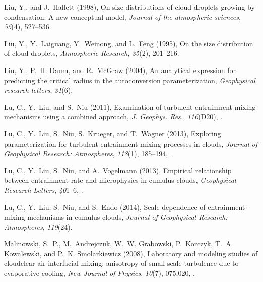 \documentclass[draft,linenumbers]{agujournal}
\begin{document}
\begin{thebibliography}{60}
Liu, Y., and J.~Hallett (1998), On size distributions of cloud droplets growing
  by condensation: A new conceptual model, \textit{Journal of the atmospheric
  sciences}, \textit{55}(4), 527--536.

Liu, Y., Y.~Laiguang, Y.~Weinong, and L.~Feng (1995), On the size distribution
  of cloud droplets, \textit{Atmospheric Research}, \textit{35}(2), 201--216.

Liu, Y., P.~H. Daum, and R.~McGraw (2004), An analytical expression for
  predicting the critical radius in the autoconversion parameterization,
  \textit{Geophysical research letters}, \textit{31}(6).

Lu, C., Y.~Liu, and S.~Niu (2011), Examination of turbulent entrainment-mixing
  mechanisms using a combined approach, \textit{J. Geophys. Res.},
  \textit{116}(D20), .

Lu, C., Y.~Liu, S.~Niu, S.~Krueger, and T.~Wagner (2013{}), Exploring
  parameterization for turbulent entrainment-mixing processes in clouds,
  \textit{Journal of Geophysical Research: Atmospheres}, \textit{118}(1),
  185--194, .

Lu, C., Y.~Liu, S.~Niu, and A.~Vogelmann (2013{}), Empirical relationship between entrainment rate and microphysics in cumulus clouds, \textit{Geophysical Research Letters}, \textit{40}1--6, .
  
Lu, C., Y.~Liu, S.~Niu, and S.~Endo (2014), Scale dependence of
  entrainment-mixing mechanisms in cumulus clouds, \textit{Journal of
  Geophysical Research: Atmospheres}, \textit{119}(24).

Malinowski, S.~P., M.~Andrejczuk, W.~W. Grabowski, P.~Korczyk, T.~A.
  Kowalewski, and P.~K. Smolarkiewicz (2008), Laboratory and modeling studies
  of cloud{\textendash}clear air interfacial mixing: anisotropy of small-scale
  turbulence due to evaporative cooling, \textit{New Journal of Physics},
  \textit{10}(7), 075,020, .


\end{thebibliography}
\end{document}
